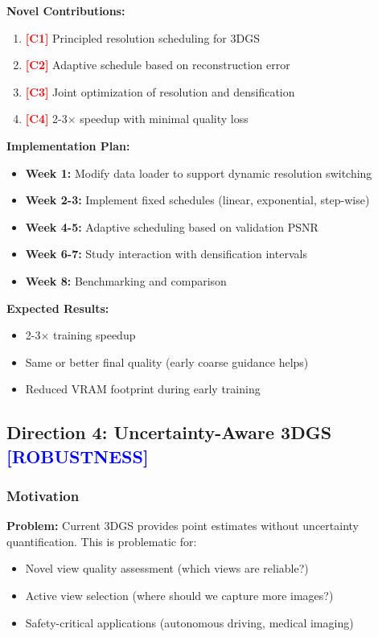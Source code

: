 \documentclass[11pt,letterpaper]{article}
\newcommand{\highlight}[1]{\textcolor{blue}{\textbf{#1}}}
\newcommand{\contribution}[1]{\textcolor{red}{\textbf{[#1]}}}
\begin{document}
\textbf{Novel Contributions:}
\begin{enumerate}[leftmargin=*]
    \item \contribution{C1} Principled resolution scheduling for 3DGS
    \item \contribution{C2} Adaptive schedule based on reconstruction error
    \item \contribution{C3} Joint optimization of resolution and densification
    \item \contribution{C4} 2-3$\times$ speedup with minimal quality loss
\end{enumerate}

\textbf{Implementation Plan:}
\begin{itemize}[leftmargin=*]
    \item \textbf{Week 1:} Modify data loader to support dynamic resolution switching
    \item \textbf{Week 2-3:} Implement fixed schedules (linear, exponential, step-wise)
    \item \textbf{Week 4-5:} Adaptive scheduling based on validation PSNR
    \item \textbf{Week 6-7:} Study interaction with densification intervals
    \item \textbf{Week 8:} Benchmarking and comparison
\end{itemize}

\textbf{Expected Results:}
\begin{itemize}[leftmargin=*]
    \item 2-3$\times$ training speedup
    \item Same or better final quality (early coarse guidance helps)
    \item Reduced VRAM footprint during early training
\end{itemize}

\subsection{Direction 4: Uncertainty-Aware 3DGS \highlight{[ROBUSTNESS]}}

\subsubsection{Motivation}

\textbf{Problem:} Current 3DGS provides point estimates without uncertainty quantification. This is problematic for:
\begin{itemize}[leftmargin=*]
    \item Novel view quality assessment (which views are reliable?)
    \item Active view selection (where should we capture more images?)
    \item Safety-critical applications (autonomous driving, medical imaging)
\end{itemize}
\end{document}
